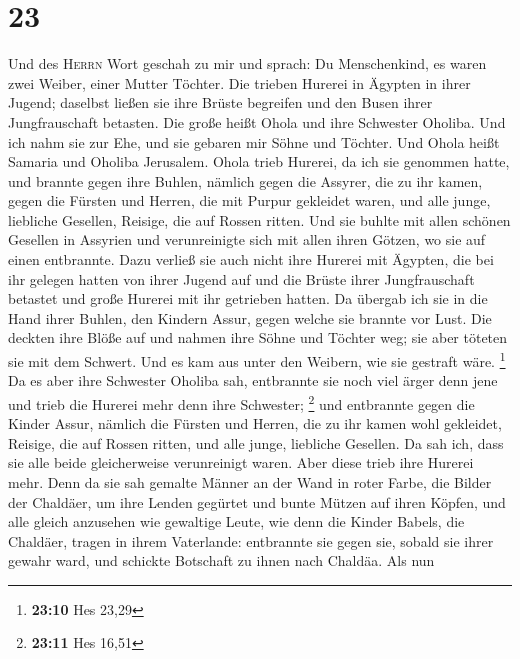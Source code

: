 \hypertarget{section-7}{%
\section{23}\label{section-7}}

 Und des \textsc{Herrn} Wort geschah zu mir und sprach:
 Du Menschenkind, es waren zwei Weiber, einer Mutter
Töchter.  Die trieben Hurerei in Ägypten in ihrer Jugend;
daselbst ließen sie ihre Brüste begreifen und den Busen ihrer
Jungfrauschaft betasten.  Die große heißt Ohola und ihre
Schwester Oholiba. Und ich nahm sie zur Ehe, und sie gebaren mir Söhne
und Töchter. Und Ohola heißt Samaria und Oholiba Jerusalem.
 Ohola trieb Hurerei, da ich sie genommen hatte, und
brannte gegen ihre Buhlen, nämlich gegen die Assyrer, die zu ihr kamen,
 gegen die Fürsten und Herren, die mit Purpur gekleidet
waren, und alle junge, liebliche Gesellen, Reisige, die auf Rossen
ritten.  Und sie buhlte mit allen schönen Gesellen in
Assyrien und verunreinigte sich mit allen ihren Götzen, wo sie auf einen
entbrannte.  Dazu verließ sie auch nicht ihre Hurerei mit
Ägypten, die bei ihr gelegen hatten von ihrer Jugend auf und die Brüste
ihrer Jungfrauschaft betastet und große Hurerei mit ihr getrieben
hatten.  Da übergab ich sie in die Hand ihrer Buhlen, den
Kindern Assur, gegen welche sie brannte vor Lust.  Die
deckten ihre Blöße auf und nahmen ihre Söhne und Töchter weg; sie aber
töteten sie mit dem Schwert. Und es kam aus unter den Weibern, wie sie
gestraft wäre. \footnote{\textbf{23:10} Hes 23,29}  Da es
aber ihre Schwester Oholiba sah, entbrannte sie noch viel ärger denn
jene und trieb die Hurerei mehr denn ihre Schwester; \footnote{\textbf{23:11}
  Hes 16,51}  und entbrannte gegen die Kinder Assur,
nämlich die Fürsten und Herren, die zu ihr kamen wohl gekleidet,
Reisige, die auf Rossen ritten, und alle junge, liebliche Gesellen.
 Da sah ich, dass sie alle beide gleicherweise
verunreinigt waren.  Aber diese trieb ihre Hurerei mehr.
Denn da sie sah gemalte Männer an der Wand in roter Farbe, die Bilder
der Chaldäer,  um ihre Lenden gegürtet und bunte Mützen
auf ihren Köpfen, und alle gleich anzusehen wie gewaltige Leute, wie
denn die Kinder Babels, die Chaldäer, tragen in ihrem Vaterlande:
 entbrannte sie gegen sie, sobald sie ihrer gewahr ward,
und schickte Botschaft zu ihnen nach Chaldäa.  Als nun

